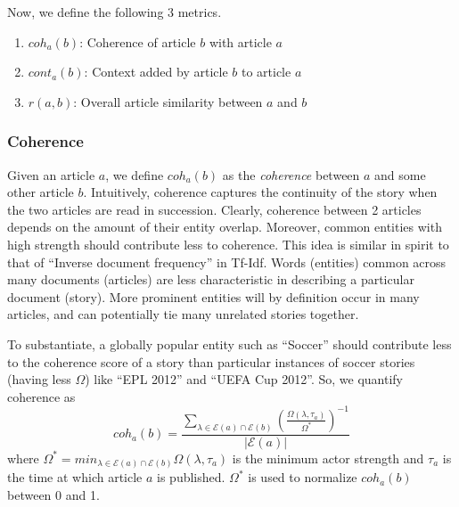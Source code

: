 Now, we define the following 3 metrics.
\begin{enumerate}
\item $coh_a(b)$: Coherence of article $b$ with article $a$
\item $cont_a(b)$: Context added by article $b$ to article $a$ 
\item $r(a, b)$: Overall article similarity between $a$ and $b$
\end{enumerate}
\subsubsection*{Coherence}
Given an article $a$, we define $coh_{a}(b)$ as the \emph{coherence} between $a$ and some other article $b$. Intuitively, coherence captures the continuity of the story when the two articles are read in succession.
Clearly, coherence between 2 articles depends on the amount of their entity overlap. Moreover, common entities with high strength should contribute less to coherence. This idea is similar in spirit to that of ``Inverse document frequency'' in Tf-Idf. Words (entities) common across many documents (articles) are less characteristic in describing a particular document (story). 
More prominent entities will by definition occur in many articles, and can potentially tie many unrelated stories together. 

To substantiate, a globally popular entity such as ``Soccer'' should contribute less to the coherence score
of a story than particular instances of soccer stories (having less $\Omega$) like ``EPL 2012'' and ``UEFA Cup 2012''. So, we quantify coherence as
\begin{equation}
coh_{a}(b) = \frac{\sum_{\lambda \in \mathcal{E}(a) \cap \mathcal{E}(b)}{(\frac{\Omega(\lambda, \tau_a)}{\Omega^{*}})^{-1}}}{|\mathcal{E}(a)|}
\end{equation}
where $\Omega^{*}=min_{\lambda \in \mathcal{E}(a) \cap \mathcal{E}(b)}{\Omega(\lambda, \tau_a)}$ is the minimum actor strength and $\tau_a$ is the time at which article $a$ is published. 
$\Omega^{*}$ is used to normalize $coh_a(b)$ between 0 and 1.

